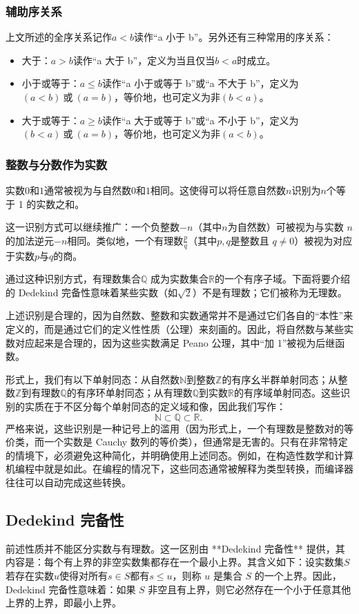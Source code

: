\subsubsection{辅助序关系}
上文所述的全序关系记作$a<b$读作“a 小于 b”。另外还有三种常用的序关系：
\begin{itemize}
\item 大于：$a>b$读作“a 大于 b”，定义为当且仅当$b<a$时成立。
\item 小于或等于：$a \leq b$读作“a 小于或等于 b”或“a 不大于 b”，定义为
$(a<b)\ \text{或}\ (a=b)$，等价地，也可定义为$\text{非}(b<a)$。
\item 大于或等于：$a \geq b$读作“a 大于或等于 b”或“a 不小于 b”，定义为
$(b<a)\ \text{或}\ (a=b)$，等价地，也可定义为$\text{非}(a<b)$。
\end{itemize}
\subsubsection{整数与分数作为实数}
实数$0$和$1$通常被视为与自然数$0$和$1$相同。这使得可以将任意自然数$n$识别为$n$个等于 1 的实数之和。

这一识别方式可以继续推广：一个负整数$-n$（其中$n$为自然数）可被视为与实数 $n$的加法逆元$-n$相同。类似地，一个有理数$\tfrac{p}{q}$（其中$p, q$是整数且 $q \neq 0$）被视为对应于实数$p$与$q$的商。

通过这种识别方式，有理数集合$\mathbb{Q}$ 成为实数集合$\mathbb{R}$的一个有序子域。下面将要介绍的 Dedekind 完备性意味着某些实数（如$\sqrt{2}$）不是有理数；它们被称为无理数。

上述识别是合理的，因为自然数、整数和实数通常并不是通过它们各自的“本性”来定义的，而是通过它们的定义性性质（公理）来刻画的。因此，将自然数与某些实数对应起来是合理的，因为这些实数满足 Peano 公理，其中“加 1”被视为后继函数。

形式上，我们有以下单射同态：从自然数$\mathbb{N}$到整数$\mathbb{Z}$的有序幺半群单射同态；从整数$\mathbb{Z}$到有理数$\mathbb{Q}$的有序环单射同态；从有理数$\mathbb{Q}$到实数$\mathbb{R}$的有序域单射同态。这些识别的实质在于不区分每个单射同态的定义域和像，因此我们写作：
$$
\mathbb{N} \subset \mathbb{Q} \subset \mathbb{R}.~
$$
严格来说，这些识别是一种记号上的滥用（因为形式上，一个有理数是整数对的等价类，而一个实数是 Cauchy 数列的等价类），但通常是无害的。只有在非常特定的情境下，必须避免这种简化，并明确使用上述同态。例如，在构造性数学和计算机编程中就是如此。在编程的情况下，这些同态通常被解释为类型转换，而编译器往往可以自动完成这些转换。
\subsection{Dedekind 完备性}
前述性质并不能区分实数与有理数。这一区别由 **Dedekind 完备性** 提供，其内容是：每个有上界的非空实数集都存在一个最小上界。其含义如下：设实数集$S$若存在实数$u$使得对所有$s \in S$都有$s \leq u$，则称 $u$ 是集合 $S$ 的一个上界。因此，Dedekind 完备性意味着：如果 $S$ 非空且有上界，则它必然存在一个小于任意其他上界的上界，即最小上界。

